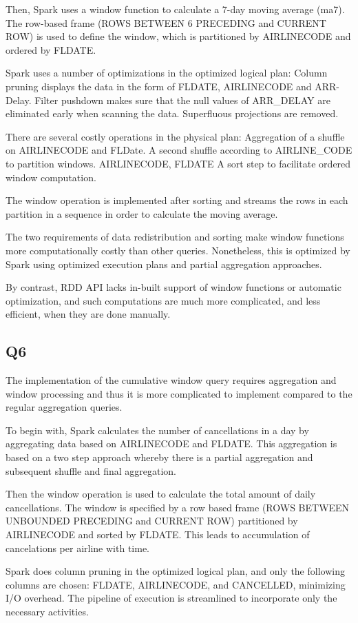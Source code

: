\documentclass{article}
\begin{document}
Then, Spark uses a window function to calculate a 7-day moving average (ma7). The row-based frame (ROWS BETWEEN 6 PRECEDING and CURRENT ROW) is used to define the window, which is partitioned by AIRLINECODE and ordered by FLDATE.

Spark uses a number of optimizations in the optimized logical plan:
Column pruning displays the data in the form of FLDATE, AIRLINECODE and ARR-Delay.
Filter pushdown makes sure that the null values of ARR\_DELAY are eliminated early when scanning the data.
Superfluous projections are removed.

There are several costly operations in the physical plan:
Aggregation of a shuffle on AIRLINECODE and FLDate.
A second shuffle according to AIRLINE\_CODE to partition windows.
AIRLINECODE, FLDATE A sort step to facilitate ordered window computation.

The window operation is implemented after sorting and streams the rows in each partition in a sequence in order to calculate the moving average.

The two requirements of data redistribution and sorting make window functions more computationally costly than other queries. Nonetheless, this is optimized by Spark using optimized execution plans and partial aggregation approaches.

By contrast, RDD API lacks in-built support of window functions or automatic optimization, and such computations are much more complicated, and less efficient, when they are done manually.
\subsection{Q6}
The implementation of the cumulative window query requires aggregation and window processing and thus it is more complicated to implement compared to the regular aggregation queries.

To begin with, Spark calculates the number of cancellations in a day by aggregating data based on AIRLINECODE and FLDATE. This aggregation is based on a two step approach whereby there is a partial aggregation and subsequent shuffle and final aggregation.

Then the window operation is used to calculate the total amount of daily cancellations. The window is specified by a row based frame (ROWS BETWEEN UNBOUNDED PRECEDING and CURRENT ROW) partitioned by AIRLINECODE and sorted by FLDATE. This leads to accumulation of cancelations per airline with time.

Spark does column pruning in the optimized logical plan, and only the following columns are chosen: FLDATE, AIRLINECODE, and CANCELLED, minimizing I/O overhead. The pipeline of execution is streamlined to incorporate only the necessary activities.
\end{document}
